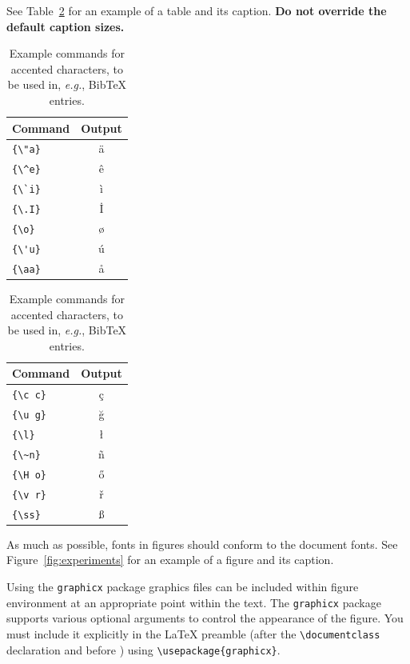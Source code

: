 See Table~\ref{tab:accents} for an example of a table and its caption.
\textbf{Do not override the default caption sizes.}

\begin{table}
  \centering
  \begin{tabular}{lc}
    \hline
    \textbf{Command} & \textbf{Output} \\
    \hline
    \verb|{\"a}|     & {\"a}           \\
    \verb|{\^e}|     & {\^e}           \\
    \verb|{\`i}|     & {\`i}           \\
    \verb|{\.I}|     & {\.I}           \\
    \verb|{\o}|      & {\o}            \\
    \verb|{\'u}|     & {\'u}           \\
    \verb|{\aa}|     & {\aa}           \\\hline
  \end{tabular}
  \begin{tabular}{lc}
    \hline
    \textbf{Command} & \textbf{Output} \\
    \hline
    \verb|{\c c}|    & {\c c}          \\
    \verb|{\u g}|    & {\u g}          \\
    \verb|{\l}|      & {\l}            \\
    \verb|{\~n}|     & {\~n}           \\
    \verb|{\H o}|    & {\H o}          \\
    \verb|{\v r}|    & {\v r}          \\
    \verb|{\ss}|     & {\ss}           \\
    \hline
  \end{tabular}
  \caption{Example commands for accented characters, to be used in, \emph{e.g.}, Bib\TeX{} entries.}
  \label{tab:accents}
\end{table}

As much as possible, fonts in figures should conform
to the document fonts. See Figure~\ref{fig:experiments} for an example of a figure and its caption.

Using the \verb|graphicx| package graphics files can be included within figure
environment at an appropriate point within the text.
The \verb|graphicx| package supports various optional arguments to control the
appearance of the figure.
You must include it explicitly in the \LaTeX{} preamble (after the
\verb|\documentclass| declaration and before \verb||) using
\verb|\usepackage{graphicx}|.

